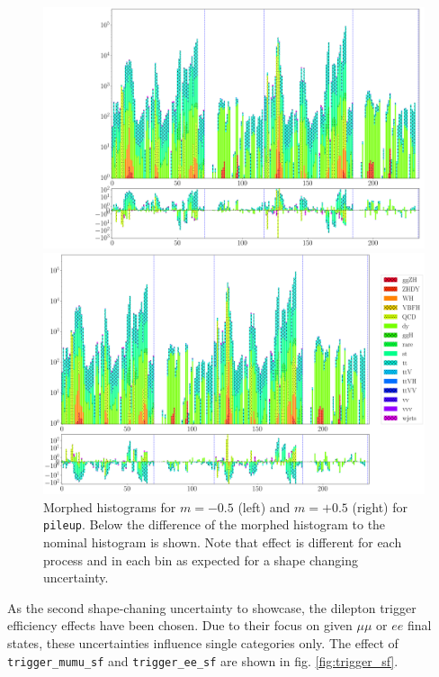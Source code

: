 \begin{figure}[h!]
	\centering
		\begin{minipage}{.5\textwidth}
				\centering
				\includegraphics[width=\linewidth]{figures/network_setup/pileup_-0.5}
			\end{minipage}%
		\begin{minipage}{.5\textwidth}
				\centering
				\includegraphics[width=\linewidth]{figures/network_setup/pileup_+0.5}
			\end{minipage}
	\caption{Morphed histograms for $m = -0.5$ (left) and $m = +0.5$ (right) for \texttt{pileup}. Below the difference of the morphed histogram to the nominal histogram is shown. Note that effect is different for each process and in each bin as expected for a shape changing uncertainty.}
	\label{fig:pileup}
\end{figure}

As the second shape-chaning uncertainty to showcase, the dilepton trigger efficiency effects have been chosen. Due to their focus on given $\mu\mu$ or $ee$ final states, these uncertainties influence single categories only. The effect of \texttt{trigger\_mumu\_sf} and \texttt{trigger\_ee\_sf} are shown in fig. \ref{fig:trigger_sf}.

